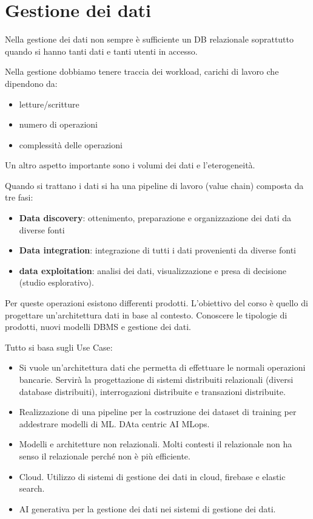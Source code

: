 \section{Gestione dei dati}
Nella gestione dei dati non sempre è sufficiente un DB relazionale soprattutto
quando si hanno tanti dati e tanti utenti in accesso.

Nella gestione dobbiamo tenere traccia dei workload, carichi di lavoro che dipendono da:
\begin{itemize}
    \item letture/scritture
    \item numero di operazioni
    \item complessità delle operazioni
\end{itemize}
Un altro aspetto importante sono i volumi dei dati e l'eterogeneità.

Quando si trattano i dati si ha una pipeline di lavoro (value chain) composta da
tre fasi:
\begin{itemize}
    \item \textbf{Data discovery}: ottenimento, preparazione e organizzazione
          dei dati da diverse fonti
    \item \textbf{Data integration}: integrazione di tutti i dati provenienti da
          diverse fonti
    \item \textbf{data exploitation}: analisi dei dati, visualizzazione e presa
          di decisione (studio esplorativo).
\end{itemize}
Per queste operazioni esistono
differenti prodotti.
L'obiettivo del corso è quello di progettare un'architettura dati in base al contesto.
Conoscere le tipologie di prodotti, nuovi modelli DBMS e gestione dei dati.

Tutto si basa sugli Use Case:
\begin{itemize}
    \item Si vuole un'architettura dati che permetta di effettuare le normali operazioni
          bancarie. Servirà la progettazione di sistemi distribuiti relazionali (diversi database distribuiti),
          interrogazioni distribuite e transazioni distribuite.
    \item Realizzazione di una pipeline per la costruzione dei dataset di training
          per addestrare modelli di ML. DAta centric AI MLops.
    \item Modelli e architetture non relazionali.  Molti contesti il relazionale
          non ha senso il relazionale perché non è più efficiente.
    \item Cloud. Utilizzo di sistemi di gestione dei dati in cloud, firebase e elastic search.
    \item AI generativa per la gestione dei dati nei sistemi di gestione dei dati.
\end{itemize}

